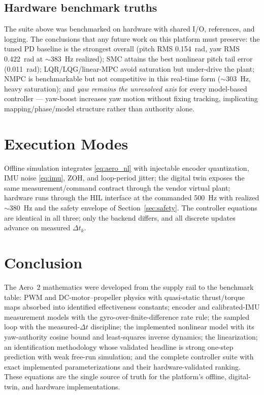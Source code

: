 \documentclass[conference]{IEEEtran}
\begin{document}
\subsection{Hardware benchmark truths}
The suite above was benchmarked on hardware with shared I/O, references, and logging. The conclusions that any future work on this platform must preserve: the tuned PD baseline is the strongest overall (pitch RMS 0.154~rad, yaw RMS 0.422~rad at $\sim$383~Hz realized); SMC attains the best nonlinear pitch tail error (0.011~rad); LQR/LQG/linear-MPC avoid saturation but under-drive the plant; NMPC is benchmarkable but not competitive in this real-time form ($\sim$303~Hz, heavy saturation); and \emph{yaw remains the unresolved axis} for every model-based controller --- yaw-boost increases yaw motion without fixing tracking, implicating mapping/phase/model structure rather than authority alone.

\section{Execution Modes}
Offline simulation integrates \eqref{eq:aero_nl} with injectable encoder quantization, IMU noise \eqref{eq:imu}, ZOH, and loop-period jitter; the digital twin exposes the same measurement/command contract through the vendor virtual plant; hardware runs through the HIL interface at the commanded 500~Hz with realized $\sim$380~Hz and the safety envelope of Section~\ref{sec:safety}. The controller equations are identical in all three; only the backend differs, and all discrete updates advance on measured $\Delta t_k$.

\section{Conclusion}
The Aero~2 mathematics were developed from the supply rail to the benchmark table: PWM and DC-motor--propeller physics with quasi-static thrust/torque maps absorbed into identified effectiveness constants; encoder and calibrated-IMU measurement models with the gyro-over-finite-difference rate rule; the sampled loop with the measured-$\Delta t$ discipline; the implemented nonlinear model with its yaw-authority cosine bound and least-squares inverse dynamics; the linearization; an identification methodology whose validated headline is strong one-step prediction with weak free-run simulation; and the complete controller suite with exact implemented parameterizations and their hardware-validated ranking. These equations are the single source of truth for the platform's offline, digital-twin, and hardware implementations.
\end{document}
